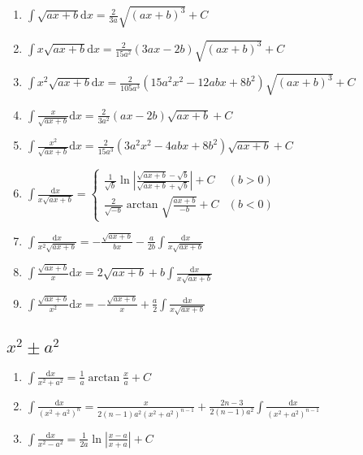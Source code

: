 	\begin{enumerate}

	\item $ \int \sqrt{ax+b} \mathrm{d}x = \frac{2}{3a} \sqrt{(ax+b)^3} + C $

	\item $ \int x \sqrt{ax+b} \mathrm{d}x = \frac{2}{15a^2}(3ax-2b) \sqrt{(ax+b)^3} + C $

	\item $ \int x^2 \sqrt{ax+b} \mathrm{d}x = \frac{2}{105a^3}(15a^2x^2-12abx+8b^2)\sqrt{(ax+b)^3} + C $

	\item $ \int \frac{x}{\sqrt{ax+b}} \mathrm{d}x = \frac{2}{3a^2} (ax-2b) \sqrt{ax+b} + C $

	\item $ \int \frac{x^2}{\sqrt{ax+b}} \mathrm{d} x = \frac{2}{15a^3} (3a^2x^2 - 4abx + 8b^2) \sqrt{ax+b} + C $

	\item $ \int \frac{\mathrm{d} x}{x\sqrt{ax+b}} = \begin{cases}
	\frac{1}{\sqrt{b}}\ln\left| \frac{\sqrt{ax+b} - \sqrt{b}}{\sqrt{ax+b} + \sqrt{b}} \right| + C & (b>0) \\
	\frac{2}{\sqrt{-b}}\arctan\sqrt{\frac{ax+b}{-b}} + C & (b<0)
	\end{cases} $

	\item $ \int \frac{\mathrm{d} x}{x^2\sqrt{ax+b}} = -\frac{\sqrt{ax+b}}{bx} - \frac{a}{2b} \int \frac{\mathrm{d} x}{x\sqrt{ax+b}} $

	\item $ \int \frac{\sqrt{ax+b}}{x}\mathrm{d} x = 2\sqrt{ax+b} + b\int\frac{\mathrm{d} x}{x\sqrt{ax+b}} $

	\item $ \int \frac{\sqrt{ax+b}}{x^2}\mathrm{d}x = -\frac{\sqrt{ax+b}}{x} + \frac{a}{2} \int \frac{\mathrm{d}x}{x\sqrt{ax+b}} $

	\end{enumerate}

	\subsection{$x^2 \pm a^2$}

	\begin{enumerate}

	\item $ \int \frac{\mathrm{d}x}{x^2 + a^2} = \frac{1}{a} \arctan\frac{x}{a} + C$

	\item $ \int \frac{\mathrm{d}x}{(x^2+a^2)^n} = \frac{x}{2(n-1)a^2(x^2+a^2)^{n-1}}+\frac{2n-3}{2(n-1)a^2} \int \frac{\mathrm{d}x}{(x^2+a^2)^{n-1}} $

	\item $\int \frac{\mathrm{d}x}{x^2-a^2} = \frac{1}{2a}\ln\left| \frac{x-a}{x+a} \right| + C $


	\end{enumerate}

